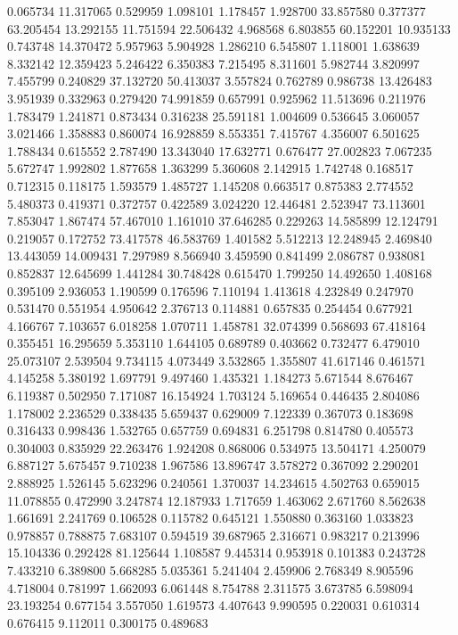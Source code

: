 0.065734
11.317065
0.529959
1.098101
1.178457
1.928700
33.857580
0.377377
63.205454
13.292155
11.751594
22.506432
4.968568
6.803855
60.152201
10.935133
0.743748
14.370472
5.957963
5.904928
1.286210
6.545807
1.118001
1.638639
8.332142
12.359423
5.246422
6.350383
7.215495
8.311601
5.982744
3.820997
7.455799
0.240829
37.132720
50.413037
3.557824
0.762789
0.986738
13.426483
3.951939
0.332963
0.279420
74.991859
0.657991
0.925962
11.513696
0.211976
1.783479
1.241871
0.873434
0.316238
25.591181
1.004609
0.536645
3.060057
3.021466
1.358883
0.860074
16.928859
8.553351
7.415767
4.356007
6.501625
1.788434
0.615552
2.787490
13.343040
17.632771
0.676477
27.002823
7.067235
5.672747
1.992802
1.877658
1.363299
5.360608
2.142915
1.742748
0.168517
0.712315
0.118175
1.593579
1.485727
1.145208
0.663517
0.875383
2.774552
5.480373
0.419371
0.372757
0.422589
3.024220
12.446481
2.523947
73.113601
7.853047
1.867474
57.467010
1.161010
37.646285
0.229263
14.585899
12.124791
0.219057
0.172752
73.417578
46.583769
1.401582
5.512213
12.248945
2.469840
13.443059
14.009431
7.297989
8.566940
3.459590
0.841499
2.086787
0.938081
0.852837
12.645699
1.441284
30.748428
0.615470
1.799250
14.492650
1.408168
0.395109
2.936053
1.190599
0.176596
7.110194
1.413618
4.232849
0.247970
0.531470
0.551954
4.950642
2.376713
0.114881
0.657835
0.254454
0.677921
4.166767
7.103657
6.018258
1.070711
1.458781
32.074399
0.568693
67.418164
0.355451
16.295659
5.353110
1.644105
0.689789
0.403662
0.732477
6.479010
25.073107
2.539504
9.734115
4.073449
3.532865
1.355807
41.617146
0.461571
4.145258
5.380192
1.697791
9.497460
1.435321
1.184273
5.671544
8.676467
6.119387
0.502950
7.171087
16.154924
1.703124
5.169654
0.446435
2.804086
1.178002
2.236529
0.338435
5.659437
0.629009
7.122339
0.367073
0.183698
0.316433
0.998436
1.532765
0.657759
0.694831
6.251798
0.814780
0.405573
0.304003
0.835929
22.263476
1.924208
0.868006
0.534975
13.504171
4.250079
6.887127
5.675457
9.710238
1.967586
13.896747
3.578272
0.367092
2.290201
2.888925
1.526145
5.623296
0.240561
1.370037
14.234615
4.502763
0.659015
11.078855
0.472990
3.247874
12.187933
1.717659
1.463062
2.671760
8.562638
1.661691
2.241769
0.106528
0.115782
0.645121
1.550880
0.363160
1.033823
0.978857
0.788875
7.683107
0.594519
39.687965
2.316671
0.983217
0.213996
15.104336
0.292428
81.125644
1.108587
9.445314
0.953918
0.101383
0.243728
7.433210
6.389800
5.668285
5.035361
5.241404
2.459906
2.768349
8.905596
4.718004
0.781997
1.662093
6.061448
8.754788
2.311575
3.673785
6.598094
23.193254
0.677154
3.557050
1.619573
4.407643
9.990595
0.220031
0.610314
0.676415
9.112011
0.300175
0.489683
